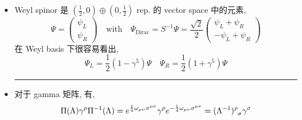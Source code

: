 \begin{itemize}
	\noindent\rule[0.5ex]{\linewidth}{0.5pt} %
	
	\item Weyl spinor 是 $(\frac{1}{2}, 0) \oplus (0, \frac{1}{2})$ rep. 的 vector space 中的元素,
	\begin{equation}
		\Psi = \begin{pmatrix}
			\psi_L \\
			\psi_R
		\end{pmatrix} \quad \text{with} \quad \Psi_\text{Dirac} = S^{- 1} \Psi = \frac{\sqrt{2}}{2} \begin{pmatrix}
			\psi_L + \psi_R \\
			- \psi_L + \psi_R
		\end{pmatrix}
	\end{equation}
	在 Weyl basis 下很容易看出,
	\begin{equation}
		\Psi_L = \frac{1}{2} (1 - \gamma^5) \Psi \quad \Psi_R = \frac{1}{2} (1 + \gamma^5) \Psi
	\end{equation}
	
	\noindent\rule[0.5ex]{\linewidth}{0.5pt} %
	
	\item 对于 gamma 矩阵, 有,
	\begin{equation}
		\Pi(\Lambda) \gamma^\rho \Pi^{- 1}(\Lambda) = e^{\frac{1}{4} \omega_{\mu \nu} \sigma^{\mu \nu}} \gamma^\rho e^{- \frac{1}{4} \omega_{\mu \nu} \sigma^{\mu \nu}} = \tensor{(\Lambda^{- 1})}{^\rho_\sigma} \gamma^\sigma
	\end{equation}
	

\end{itemize}
